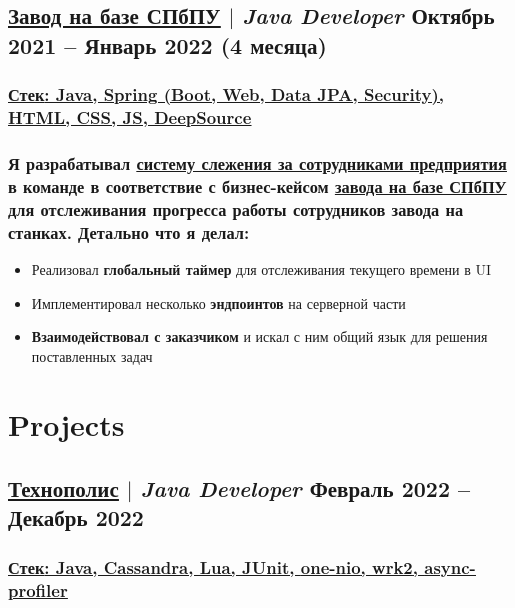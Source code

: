 \documentclass[11pt]{article}
\begin{document}
\subsection{\href{https://www.spbstu.ru/}{\underline{Завод на базе СПбПУ}} $|$ {\normalfont\textit{Java Developer}} \hfill Октябрь 2021 -- Январь 2022 (4 месяца)}
\subsubsection{\underline{\textbf{Стек}: Java, Spring (Boot, Web, Data JPA, Security), HTML, CSS, JS, \href{https://deepsource.com/}{DeepSource}}}
\subsubsection{Я разрабатывал \href{https://github.com/martyn-fanclub/tracking-system}{\underline{систему слежения за сотрудниками предприятия}} в команде в соответствие с бизнес-кейсом \href{https://www.spbstu.ru/}{\underline{завода на базе СПбПУ}} для отслеживания прогресса работы сотрудников завода на станках. Детально что я делал:}
\begin{itemize}
    \item Реализовал \textbf{глобальный таймер} для отслеживания текущего времени в UI
    \item Имплементировал несколько \textbf{эндпоинтов} на серверной части
    \item \textbf{Взаимодействовал с заказчиком} и искал с ним общий язык для решения поставленных задач
\end{itemize}

\section{Projects}
\subsection{\href{https://polis.vk.company/}{\underline{Технополис}} $|$ {\normalfont\textit{Java Developer}} \hfill Февраль 2022 -- Декабрь 2022}
\subsubsection{\underline{\textbf{Стек}: Java, Cassandra, Lua, JUnit, \href{https://github.com/odnoklassniki/one-nio}{one-nio}, \href{https://github.com/giltene/wrk2}{wrk2}, \href{https://github.com/async-profiler/async-profiler}{async-profiler}}}
\end{document}
